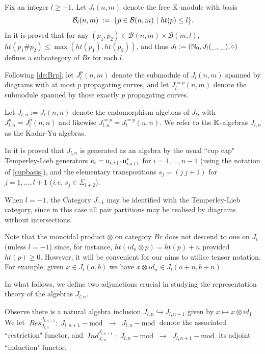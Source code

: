 \mdef   \label{de:Jln}
Fix an integer $l\geq -1$. Let $J_{l}(n,m)$ denote the free $\mathbb{K}$-module with basis 
$$
{\mathcal B}_l(n,m) \; := \; \{ p \in \mathcal{B}(n,m) \ | \ ht(p)\leq l\}    .
$$ 
In \cite[Thm. 3.4]{KadarYu} it is proved that for any $(p_1, p_2)\in \mathcal{B}(n,m)\times \mathcal{B}(m,l)$,  $ht(p_1\# p_2)\leq \max(ht(p_1),ht(p_2))$, and thus 
$J_l:=(\mathbb{N}_0,J_l(\_, \_), \circ )$ defines a subcategory of $Br$ for each $l$. 

Following \ref{de:Brp}, let $J_l^p(n,m)$ denote the submodule of $J_{l}(n,m)$ spanned by diagrams with at most $p$ propagating curves, and let $J_l^{=p}(n,m)$ denote the submodule spanned by those exactly $p$ propagating curves.   

Let $J_{l,n}:=J_{l}(n,n)$ denote the endomorphism algebras of $J_l$, with $J^{p}_{l,n}=J^{p}_{l}(n,n)$ and likewise $J^{=p}_{l,n}=J^{=p}_{l}(n,n)$. 
We refer to the $\mathbb{K}$-algebras $J_{l,n}$ as the Kadar-Yu algebras.


\mdef\label{pa:Jlngens} In \cite{KY2} it is proved that $J_{l,n}$ is generated as an algebra by the usual ``cup cap" Temperley-Lieb generators $e_i={\mathsf u}_{i,i+1} {\mathsf u}_{i,i+1}^*$ for $i=1,\dots, n-1$ (using the notation of \ref{cupbasis}), and the elementary transpositions $s_j=(j \ j+1)$ for $j=1,\dots,l+1$ (\textit{i.e.} $s_j \in \Sigma_{l+2}$).

\begin{remark} When $l=-1$, the Category $J_{-1}$ may be identified with the Temperley-Lieb category, since in this case all pair partitions may be realised by diagrams without intersections. 
\end{remark}

\mdef 
Note that the monoidal product $\otimes$ on category $Br$ does not descend to one on $J_{l}$ (unless $l=-1$) since, for instance, $ht(id_n \otimes p)=ht(p)+n$ provided $ht(p)\geq 0$. However, it will be convenient for our aims to utilise tensor notation. 
For example, given $x\in J_l(a,b)$ we have $x\otimes id_n \in J_l(a+n,b+n)$. 

\medskip 

In what follows, we define two adjunctions crucial in studying the representation theory of  the algebras $J_{l,n}$. 



\mdef Observe there is a natural algebra inclusion $J_{l,n} \hookrightarrow J_{l,n+1}$ given by 
$x\mapsto x\otimes id_1$. We let $\; Res^{J_{l,n+1}}_{J_{l,n}}: \; J_{l,n+1}-\text{mod} \; \; \rightarrow \;\; J_{l,n}-\text{mod}\;$ denote the associated ``restriction" functor, and $\; Ind^{J_{l,n+1}}_{J_{l,n}} \; :\; J_{l,n}-\text{mod}\;\; \rightarrow\;\; J_{l,n+1}-\text{mod}\;$ its adjoint ``induction" functor. 


